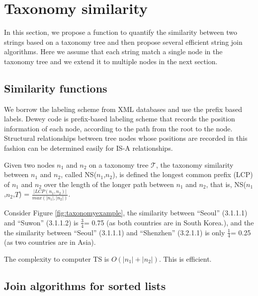 \section{Taxonomy similarity}

In this section, we propose a function to quantify the similarity between two strings based on a taxonomy tree and then propose several efficient string join algorithms. Here we assume that each string match a single node in the taxonomy tree and we extend it to multiple nodes in the next section.


\subsection{Similarity functions}

We borrow the labeling scheme from XML databases and use the prefix based labels. Dewey code is prefix-based labeling scheme that records the position information of each node, according to the path from the root to the node. Structural relationships between tree nodes whose positions are recorded in this fashion can be determined easily for IS-A relationships.



\begin{definition}
Given two nodes $n_1$ and $n_2$ on a taxonomy tree $\mathcal{T}$, the taxonomy similarity between $n_1$ and $n_2$, called NS($n_1$,$n_2$), is defined the longest common prefix (LCP) of  $n_1$ and $n_2$ over the length of the longer path between $n_1$ and $n_2$, that is,  NS($n_1$,$n_2$,$T$) = $\frac{|LCP(n_1,n_2)|}{max(|n_1|,|n_2|)}$. \end{definition}

\smallskip
\smallskip


\begin{example}
Consider Figure \ref{fig:taxonomyexample}, the similarity between ``\textsf{Seoul}'' (3.1.1.1) and ``\textsf{Suwon}'' (3.1.1.2) is $\frac{3}{4}$= 0.75 (as both countries are in South Korea.), and the the similarity between ``\textsf{Seoul}''  (3.1.1.1) and ``\textsf{Shenzhen}'' (3.2.1.1) is only $\frac{1}{4}$= 0.25 (as two countries are in Asia).
\end{example}

The complexity to computer TS is $O(|n_1|+|n_2|)$. This is efficient.



\subsection{Join algorithms for sorted lists}

